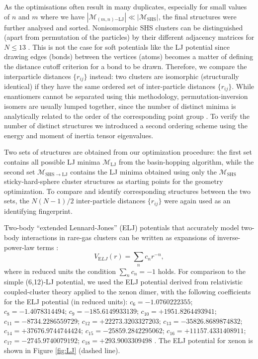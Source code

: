 As the optimisations often result in many duplicates, especially for small
values of $n$ and $m$ where we have
$|\mathcal{M}_{(m,n)\mathrm{-LJ}}| \ll |\mathcal{M}_\mathrm{SHS}|$, the final
structures were further analysed and sorted. Nonisomorphic SHS clusters can be
distinguished (apart from permutation of the particles) by their different
adjacency matrices for $N \leq 13$ \autocite{Holmes-Cerfon_EnumeratingRigidSphere_2016}.  This is not the case for
soft potentials like the LJ potential since drawing edges (bonds) between the
vertices (atoms) becomes a matter of defining the distance cutoff criterion
for a bond to be drawn. Therefore, we compare the interparticle distances $\{r_{ij}\}$
instead: two clusters are isomorphic (structurally identical) if they have the same ordered
set of inter-particle distances $\{r_{ij}\}$.  While enantiomers cannot be
separated using this methodology, permutation-inversion isomers are usually
lumped together, since the number of distinct minima is analytically related to
the order of the corresponding point group \autocite{wales04}.  To verify the
number of distinct structures we introduced a second ordering scheme using the
energy and moment of inertia tensor eigenvalues. 

Two sets of structures are obtained from our optimization procedure: the first
set contains all possible LJ minima $\mathcal{M}_\mathrm{LJ}$ from the basin-hopping
algorithm, while the second set $\mathcal{M}_\mathrm{SHS\to LJ}$ contains the
LJ minima obtained using only the $\mathcal{M}_\mathrm{SHS}$ sticky-hard-sphere cluster structures as starting points for the geometry optimization.
To compare and identify corresponding structures between the two sets, the
$N(N-1)/2$ inter-particle distances $\{r_{ij}\}$ were again used as an identifying fingerprint.

Two-body ``extended Lennard-Jones'' (ELJ) potentials that accurately model two-body interactions in rare-gas clusters can be written as expansions of inverse-power-law terms \autocite{Schwerdtfeger_ExtensionLennardJonespotential_2006}:
\begin{equation} \label{eq:ELJ}
V_{\mathrm ELJ}(r)=\sum_{n} c_nr^{-n},
\end{equation}
where in reduced units the condition $\sum_{n} c_n=-1$ holds.
For comparison to the simple (6,12)-LJ potential, we used the ELJ potential
derived from relativistic coupled-cluster theory applied to the xenon dimer,
with the following coefficients for the ELJ potential (in reduced units):
$c_6=-1.0760222355$; $c_8=-1.4078314494$; $c_9=-185.6149933139$;
$c_{10}=+1951.8264493941$; $c_{11}=-8734.2286559729$;
$c_{12}=+22273.3203327203$; $c_{13}=-35826.8689874832$;
$c_{14}=+37676.9744744424$; $c_{15}=-25859.2842295062$;
$c_{16}=+11157.4331408911$; $c_{17}=-2745.9740079192$; $c_{18}=+293.9003309498$
\autocite{Jerabek_relativisticcoupledclusterinteraction_2017}. The ELJ potential for xenon is shown in
Figure \ref{fig:LJ} (dashed line).



